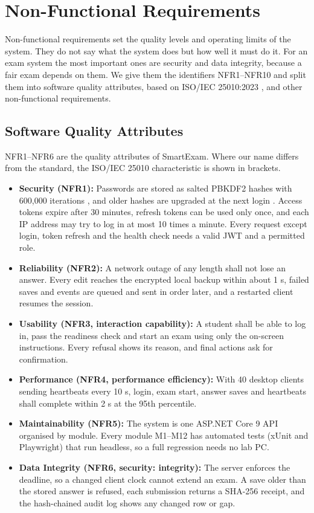 \section{Non-Functional Requirements}
Non-functional requirements set the quality levels and operating limits of the system. They do not say what the system does but how well it must do it. For an exam system the most important ones are security and data integrity, because a fair exam depends on them. We give them the identifiers NFR1--NFR10 and split them into software quality attributes, based on ISO/IEC 25010:2023 \cite{iso25010}, and other non-functional requirements.

\subsection{Software Quality Attributes}
\label{sec:qualityattributes}
NFR1--NFR6 are the quality attributes of SmartExam. Where our name differs from the standard, the ISO/IEC 25010 characteristic is shown in brackets.
\begin{itemize}
    \item \textbf{Security (NFR1):} Passwords are stored as salted PBKDF2 hashes with 600,000 iterations \cite{owasp_pwd}, and older hashes are upgraded at the next login \cite{nist80063b}. Access tokens expire after 30 minutes, refresh tokens can be used only once, and each IP address may try to log in at most 10 times a minute. Every request except login, token refresh and the health check needs a valid JWT \cite{rfc7519} and a permitted role.
    \item \textbf{Reliability (NFR2):} A network outage of any length shall not lose an answer. Every edit reaches the encrypted local backup within about 1 s, failed saves and events are queued and sent in order later, and a restarted client resumes the session.
    \item \textbf{Usability (NFR3, interaction capability):} A student shall be able to log in, pass the readiness check and start an exam using only the on-screen instructions. Every refusal shows its reason, and final actions ask for confirmation.
    \item \textbf{Performance (NFR4, performance efficiency):} With 40 desktop clients sending heartbeats every 10 s, login, exam start, answer saves and heartbeats shall complete within 2 s at the 95th percentile.
    \item \textbf{Maintainability (NFR5):} The system is one ASP.NET Core 9 API organised by module. Every module M1--M12 has automated tests (xUnit and Playwright) that run headless, so a full regression needs no lab PC.
    \item \textbf{Data Integrity (NFR6, security: integrity):} The server enforces the deadline, so a changed client clock cannot extend an exam. A save older than the stored answer is refused, each submission returns a SHA-256 receipt, and the hash-chained audit log shows any changed row or gap.
\end{itemize}

